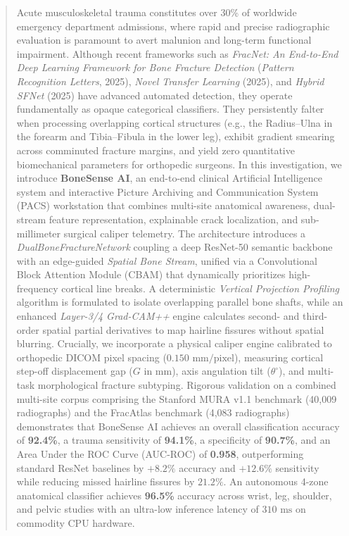 \documentclass[3p,twocolumn]{elsarticle}
\begin{document}
\begin{frontmatter}
\begin{abstract}
Acute musculoskeletal trauma constitutes over 30\% of worldwide emergency department admissions, where rapid and precise radiographic evaluation is paramount to avert malunion and long-term functional impairment. Although recent frameworks such as \textit{FracNet: An End-to-End Deep Learning Framework for Bone Fracture Detection} (\textit{Pattern Recognition Letters}, 2025), \textit{Novel Transfer Learning} (2025), and \textit{Hybrid SFNet} (2025) have advanced automated detection, they operate fundamentally as opaque categorical classifiers. They persistently falter when processing overlapping cortical structures (e.g., the Radius--Ulna in the forearm and Tibia--Fibula in the lower leg), exhibit gradient smearing across comminuted fracture margins, and yield zero quantitative biomechanical parameters for orthopedic surgeons. In this investigation, we introduce \textbf{BoneSense AI\texttrademark}, an end-to-end clinical Artificial Intelligence system and interactive Picture Archiving and Communication System (PACS) workstation that combines multi-site anatomical awareness, dual-stream feature representation, explainable crack localization, and sub-millimeter surgical caliper telemetry. The architecture introduces a \textit{DualBoneFractureNetwork} coupling a deep ResNet-50 semantic backbone with an edge-guided \textit{Spatial Bone Stream}, unified via a Convolutional Block Attention Module (CBAM) that dynamically prioritizes high-frequency cortical line breaks. A deterministic \textit{Vertical Projection Profiling} algorithm is formulated to isolate overlapping parallel bone shafts, while an enhanced \textit{Layer-3/4 Grad-CAM++} engine calculates second- and third-order spatial partial derivatives to map hairline fissures without spatial blurring. Crucially, we incorporate a physical caliper engine calibrated to orthopedic DICOM pixel spacing ($0.150\text{ mm/pixel}$), measuring cortical step-off displacement gap ($G$ in mm), axis angulation tilt ($\theta^\circ$), and multi-task morphological fracture subtyping. Rigorous validation on a combined multi-site corpus comprising the Stanford MURA v1.1 benchmark (40,009 radiographs) and the FracAtlas benchmark (4,083 radiographs) demonstrates that BoneSense AI achieves an overall classification accuracy of \textbf{92.4\%}, a trauma sensitivity of \textbf{94.1\%}, a specificity of \textbf{90.7\%}, and an Area Under the ROC Curve (AUC-ROC) of \textbf{0.958}, outperforming standard ResNet baselines by $+8.2\%$ accuracy and $+12.6\%$ sensitivity while reducing missed hairline fissures by $21.2\%$. An autonomous 4-zone anatomical classifier achieves \textbf{96.5\%} accuracy across wrist, leg, shoulder, and pelvic studies with an ultra-low inference latency of $310\text{ ms}$ on commodity CPU hardware.
\end{abstract}


\end{frontmatter}
\end{document}
